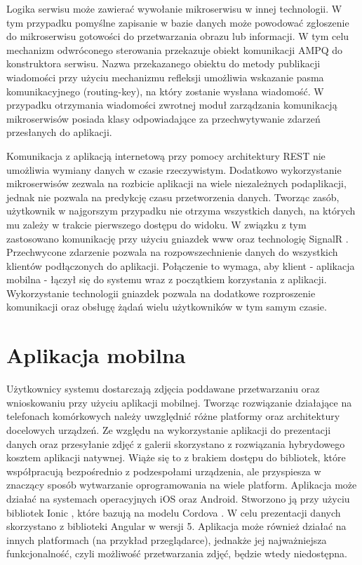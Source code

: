 {Logika serwisu może zawierać wywołanie mikroserwisu w innej technologii. W tym przypadku pomyślne zapisanie w bazie danych może powodować zgłoszenie do mikroserwisu gotowości do przetwarzania obrazu lub informacji. W tym celu mechanizm odwróconego sterowania przekazuje obiekt komunikacji AMPQ do konstruktora serwisu. Nazwa przekazanego obiektu do metody publikacji wiadomości przy użyciu mechanizmu refleksji umożliwia wskazanie pasma komunikacyjnego (routing-key), na który zostanie wysłana wiadomość. W przypadku otrzymania wiadomości zwrotnej moduł zarządzania komunikacją mikroserwisów posiada klasy odpowiadające za przechwytywanie zdarzeń przesłanych do aplikacji. 

Komunikacja z aplikacją internetową przy pomocy architektury REST nie umożliwia wymiany danych w czasie rzeczywistym. Dodatkowo wykorzystanie mikroserwisów zezwala na rozbicie aplikacji na wiele niezależnych podaplikacji, jednak nie pozwala na predykcję czasu przetworzenia danych. Tworząc zasób, użytkownik w najgorszym przypadku nie otrzyma wszystkich danych, na których mu zależy w trakcie pierwszego dostępu do widoku. W związku z tym zastosowano komunikację przy użyciu gniazdek www oraz technologię SignalR \cite{SignalR}. Przechwycone zdarzenie pozwala na rozpowszechnienie danych do wszystkich klientów podłączonych do aplikacji. Połączenie to wymaga, aby klient - aplikacja mobilna - łączył się do systemu wraz z początkiem korzystania z aplikacji. Wykorzystanie technologii gniazdek pozwala na dodatkowe rozproszenie komunikacji oraz obsługę żądań wielu użytkowników w tym samym czasie.

\section{Aplikacja mobilna}
{ Użytkownicy systemu dostarczają zdjęcia poddawane przetwarzaniu oraz wnioskowaniu przy użyciu aplikacji mobilnej. Tworząc rozwiązanie działające na telefonach komórkowych należy uwzględnić różne platformy oraz architektury docelowych urządzeń. Ze względu na wykorzystanie aplikacji do prezentacji danych oraz przesyłanie zdjęć z galerii skorzystano z rozwiązania hybrydowego kosztem aplikacji natywnej. Wiąże się to z brakiem dostępu do bibliotek, które współpracują bezpośrednio z podzespołami urządzenia, ale przyspiesza w znaczący sposób wytwarzanie oprogramowania na wiele platform. Aplikacja może działać na systemach operacyjnych iOS oraz Android. Stworzono ją przy użyciu bibliotek Ionic \cite{Ionic}, które bazują na modelu Cordova \cite{Cordova}. W celu prezentacji danych skorzystano z biblioteki Angular\cite{Angular} w wersji 5. Aplikacja może również działać na innych platformach (na przykład przeglądarce), jednakże jej najważniejsza funkcjonalność, czyli możliwość przetwarzania zdjęć, będzie wtedy niedostępna.
	
}}
